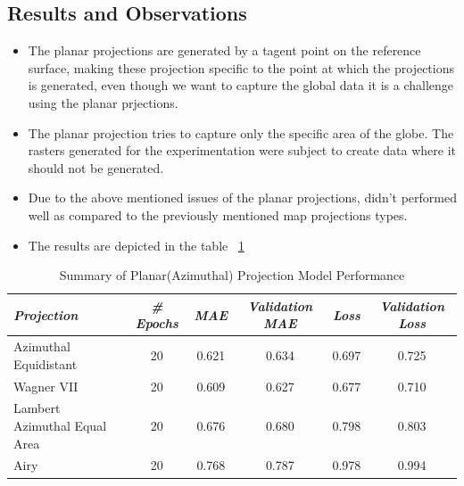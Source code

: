 \subsection{Results and Observations}
\begin{itemize}
    \item The planar projections are generated by a tagent point on the reference surface, making these projection specific to the point at which the projections is generated, even though we want to capture the global data
          it is a challenge using the planar prjections.
    \item The planar projection tries to capture only the specific area of the globe. The rasters generated for the experimentation were subject to create data where it should not be generated.
    \item Due to the above mentioned issues of the planar projections, didn't performed well as compared to the previously mentioned map projections types.
    \item The results are depicted in the table ~\ref{planner_results_table}
\end{itemize}
\begin{table}[ht]
    \caption{Summary of Planar(Azimuthal) Projection Model Performance}
    \label{planner_results_table}
    \renewcommand{\arraystretch}{1.2} %
    \begin{tabular}{|l|c|c|c|c|c|}
        \hline
        \rowcolor[gray]{0.9}
        \textbf{\emph{Projection}}   & \textbf{\emph{\# Epochs}} & \textbf{\emph{MAE}} & \textbf{\emph{Validation MAE}} & \textbf{\emph{Loss}} & \textbf{\emph{Validation Loss}} \\ \hline
        Azimuthal Equidistant        & 20                        & 0.621               & 0.634                          & 0.697                & 0.725                           \\ \hline
        Wagner VII                   & 20                        & 0.609               & 0.627                          & 0.677                & 0.710                           \\ \hline
        Lambert Azimuthal Equal Area & 20                        & 0.676               & 0.680                          & 0.798                & 0.803                           \\ \hline
        Airy                         & 20                        & 0.768               & 0.787                          & 0.978                & 0.994                           \\ \hline
    \end{tabular}
\end{table}
